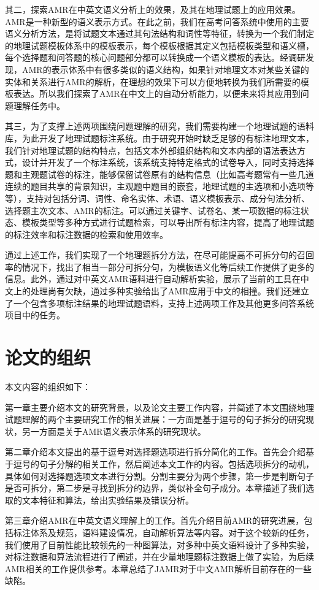 \documentclass[master, winfont]{njuthesis}
\begin{document}
其二，探索AMR在中英文语义分析上的效果，及其在地理试题上的应用效果。AMR是一种新型的语义表示方式。在此之前，我们在高考问答系统中使用的主要语义分析方法，是将试题文本通过其句法结构和词性等特征，转换为一个我们制定的地理试题模板体系中的模板表示，每个模板根据其定义包括模板类型和语义槽，每个选择题和问答题的核心问题部分都可以转换成一个语义模板的表达。经调研发现，AMR的表示体系中有很多类似的语义结构，如果针对地理文本对某些关键的实体和关系进行AMR的解析，在理想的效果下可以方便地转换为我们所需要的模板表达。所以我们探索了AMR在中文上的自动分析能力，以便未来将其应用到问题理解任务中。

其三，为了支撑上述两项围绕问题理解的研究，我们需要构建一个地理试题的语料库，为此开发了地理试题标注系统。由于研究开始时缺乏足够的有标注地理文本，我们针对地理试题的结构特点，包括文本外部组织结构和文本内部的语法表达方式，设计并开发了一个标注系统，该系统支持特定格式的试卷导入，同时支持选择题和主观题试卷的标注，能够保留试卷原有的结构信息（比如高考题常有一些几道连续的题目共享的背景知识，主观题中题目的嵌套，地理试题的主选项和小选项等等），支持对包括分词、词性、命名实体、术语、语义模板表示、成分句法分析、选择题主次文本、AMR的标注。可以通过关键字、试卷名、某一项数据的标注状态、模板类型等多种方式进行试题检索，可以导出所有标注内容，提高了地理试题的标注效率和标注数据的检索和使用效率。

通过上述工作，我们实现了一个地理题拆分方法，在尽可能提高不可拆分句的召回率的情况下，找出了相当一部分可拆分句，为模板语义化等后续工作提供了更多的信息。此外，通过对中英文AMR语料进行自动解析实验，展示了当前的工具在中文上的处理尚有欠缺，通过多种实验给出了AMR应用于中文的相撞。我们还建立了一个包含多项标注结果的地理试题语料，支持上述两项工作及其他更多问答系统项目中的任务。

\section{论文的组织}
本文内容的组织如下：

第一章主要介绍本文的研究背景，以及论文主要工作内容，并简述了本文围绕地理试题理解的两个主要研究工作的相关进展：一方面是基于逗号的句子拆分的研究现状，另一方面是关于AMR语义表示体系的研究现状。

第二章介绍本文提出的基于逗号对选择题选项进行拆分简化的工作。首先会介绍基于逗号的句子分解的相关工作，然后阐述本文工作的内容。包括选项拆分的动机，具体如何对选择题选项文本进行分割。分割主要分为两个步骤，第一步是判断句子是否可拆分，第二步是寻找到拆分的边界，类似补全句子成分。本章描述了我们选取的文本特征和算法，给出实验结果及错误分析。

第三章介绍AMR在中英文语义理解上的工作。首先介绍目前AMR的研究进展，包括标注体系及规范，语料建设情况，自动解析算法等内容。对于这个较新的任务，我们使用了目前性能比较领先的一种图算法，对多种中英文语料设计了多种实验，对标注数据和算法流程进行了阐述，并在少量地理题标注数据上做了实验，为后续AMR相关的工作提供参考。本章总结了JAMR对于中文AMR解析目前存在的一些缺陷。
\end{document}
